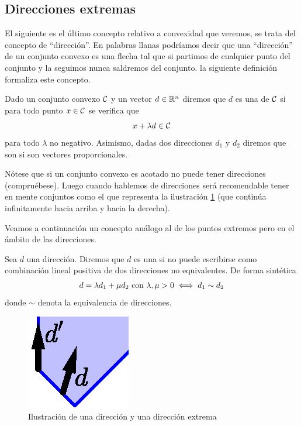 \subsection{Direcciones extremas}
El siguiente es el último concepto relativo a convexidad que veremos, se trata del concepto de ``dirección''. En palabras llanas podríamos decir que una ``dirección'' de un conjunto convexo es una flecha tal que si partimos de cualquier punto del conjunto y la seguimos nunca saldremos del conjunto. la siguiente definición formaliza este concepto.
\begin{defi}[Dirección]
	Dado un conjunto convexo $\mathcal{C}$ y un vector $d\in\mathbb{R}^n$ diremos que $d$ es una  de $\mathcal{C}$ si para todo punto $x\in\mathcal{C}$ se verifica que
	\begin{equation*}
		x+\lambda d\in \mathcal{C}
	\end{equation*}
	para todo $\lambda$ no negativo. Asimismo, dadas dos direcciones $d_1$ y $d_2$ diremos que son  si son vectores proporcionales.
\end{defi}
\begin{obs}[No acotación]
	Nótese que si un conjunto convexo es acotado no puede tener direcciones (compruébese). Luego cuando hablemos de direcciones será recomendable tener en mente conjuntos como el que representa la ilustración \ref{fund_img_direcciones} (que continúa infinitamente hacia arriba y hacia la derecha).
\end{obs}
Veamos a continuación un concepto análogo al de los puntos extremos pero en el ámbito de las direcciones.
\begin{defi}
	Sea $d$ una dirección. Diremos que $d$ es una  si no puede escribirse como combinación lineal positiva de dos direcciones no equivalentes. De forma sintética
	\begin{equation*}
		d=\lambda d_1+\mu d_2\text{ con }\lambda,\mu>0\iff d_1\sim d_2
	\end{equation*}
	donde $\sim$ denota la equivalencia de direcciones.
\end{defi}
\begin{figure}[h!]
	\centering
	\label{fund_img_direcciones}
	\includegraphics[scale = 0.75]{img/direcciones}
	\caption{Ilustración de una dirección y una dirección extrema}
\end{figure}
